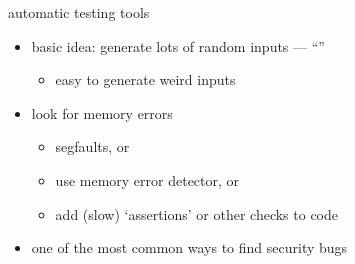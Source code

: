 
\begin{frame}{automatic testing tools}
    \begin{itemize}
        \item basic idea: generate lots of random inputs --- ``''
            \begin{itemize}
            \item easy to generate weird inputs
            \end{itemize}
        \item look for memory errors
            \begin{itemize}
            \item segfaults, or
            \item use memory error detector, or
            \item add (slow) `assertions' or other checks to code
            \end{itemize}
        \vspace{.5cm}
        \item one of the most common ways to find security bugs
    \end{itemize}
\end{frame}

